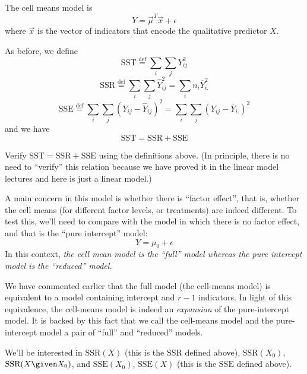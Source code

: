\documentclass[12pt]{article}
\newcommand\SSR{\text{SSR}}
\newcommand\SSE{\text{SSE}}
\begin{document}
The cell means model is
\[
Y = \vec{\mu}^T \vec{x} + \epsilon
\]
where $\vec{x}$ is the vector of indicators that
encode the qualitative predictor $X$.

As before, we define
\[
\text{SST}
\overset{\text{def}}{=} \sum_i\sum_j Y_{ij}^2
\]
\[
\SSR
\overset{\text{def}}{=} \sum_i\sum_j \hat{Y}_{ij}^2
= \sum_i n_i \overline{Y}_{i.}^2
\]
\[
\SSE
\overset{\text{def}}{=} \sum_i\sum_j (Y_{ij} - \hat{Y}_{ij})^2
= \sum_i\sum_j (Y_{ij} - \overline{Y}_{i.})^2
\]
and we have
\begin{equation}\label{eq:SST=SSR+SSE}
\text{SST} = \SSR + \SSE
\end{equation}

\exercise
Verify $\text{SST} = \SSR + \SSE$ using
the definitions above.
(In principle, there is no need to ``verify'' this relation
because we have proved it in the linear model lectures
and here is just a linear model.)

A main concern in this model is whether there is ``factor effect'',
that is, whether the cell means (for different factor levels, or
treatments) are indeed different.
To test this, we'll need to compare with the model in which
there is no factor effect, and that is the ``pure intercept'' model:
\[
Y = \mu_0 + \epsilon
\]
In this context,
\emph{the cell mean model is the ``full'' model whereas
the pure intercept model is the ``reduced'' model.}

\alert
We have commented earlier that
the full model (the cell-means model) is equivalent to a model
containing intercept and $r-1$ indicators.
In light of this equivalence,
the cell-means model is indeed an \emph{expansion} of the pure-intercept model.
It is backed by this fact
that we call the cell-means model and the
pure-intercept model a pair of ``full'' and ``reduced'' models.

We'll be interested in $\SSR(X)$
(this is the $\SSR$ defined above),
$\SSR(X_0)$, $\SSR(X \given X_0)$,
and $\SSE(X_0)$, $\SSE(X)$ (this is the $\SSE$ defined above).
\end{document}
